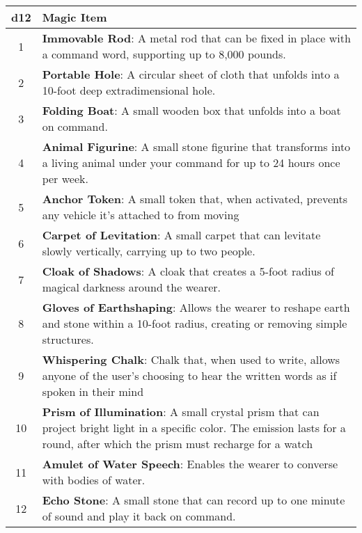 \renewcommand{\arraystretch}{1.1}
\begin{adjustbox}{height=0.25\textheight, keepaspectratio, center}
    \begin{tabular}{|c|p{}|}
    \hline
    \textbf{d12} & \textbf{Magic Item} \\
    \hline
    1 & \textbf{Immovable Rod}: A metal rod that can be fixed in place with a command word, supporting up to 8,000 pounds. \\
    \hline
    2 & \textbf{Portable Hole}: A circular sheet of cloth that unfolds into a 10-foot deep extradimensional hole. \\
    \hline
    3 & \textbf{Folding Boat}: A small wooden box that unfolds into a boat on command. \\
    \hline
    4 & \textbf{Animal Figurine}: A small stone figurine that transforms into a living animal under your command for up to 24 hours once per week. \\
    \hline
    5 & \textbf{Anchor Token}: A small token that, when activated, prevents any vehicle it's attached to from moving \\
    \hline
    6 & \textbf{Carpet of Levitation}: A small carpet that can levitate slowly vertically, carrying up to two people. \\
    \hline
    7 & \textbf{Cloak of Shadows}: A cloak that creates a 5-foot radius of magical darkness around the wearer. \\
    \hline
    8 & \textbf{Gloves of Earthshaping}: Allows the wearer to reshape earth and stone within a 10-foot radius, creating or removing simple structures. \\
    \hline
    9 & \textbf{Whispering Chalk}: Chalk that, when used to write, allows anyone of the user's choosing to hear the written words as if spoken in their mind \\
    \hline
    10 & \textbf{Prism of Illumination}: A small crystal prism that can project bright light in a specific color. The emission lasts for a round, after which the prism must recharge for a watch \\
    \hline
    11 & \textbf{Amulet of Water Speech}: Enables the wearer to converse with bodies of water. \\
    \hline
    12 & \textbf{Echo Stone}: A small stone that can record up to one minute of sound and play it back on command. \\
    \hline
    \end{tabular}
\end{adjustbox}
\renewcommand{\arraystretch}{1}